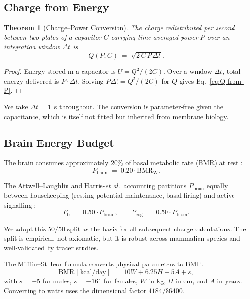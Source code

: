 \documentclass[11pt,twocolumn,a4paper]{article}
\newtheorem{theorem}{Theorem}[section]
\theoremstyle{definition}
\theoremstyle{remark}
\newcommand{\Pb}{P_{\mathrm{b}}}
\newcommand{\Pbrain}{P_{\mathrm{brain}}}
\newcommand{\Pcog}{P_{\mathrm{cog}}}
\begin{document}
\subsection{Charge from Energy}

\begin{theorem}[Charge--Power Conversion]
\label{thm:charge-power}
The charge redistributed per second between two plates of a capacitor
$C$ carrying time-averaged power $P$ over an integration window
$\Delta t$ is
\begin{equation}
Q(P; C) \;=\; \sqrt{2\,C\,P\,\Delta t}.
\label{eq:Q-from-P}
\end{equation}
\end{theorem}

\begin{proof}
Energy stored in a capacitor is $U = Q^2/(2C)$. Over a window $\Delta
t$, total energy delivered is $P \cdot \Delta t$. Solving
$P\Delta t = Q^2/(2C)$ for $Q$ gives Eq.~\eqref{eq:Q-from-P}.
\end{proof}

We take $\Delta t = 1$~s throughout. The conversion is
parameter-free given the capacitance, which is itself
not fitted but inherited from membrane biology.

\subsection{Brain Energy Budget}

The brain consumes approximately $20\%$ of basal metabolic rate
(BMR) at rest \citep{raichle2006, attwell2001}:
\begin{equation}
\Pbrain \;=\; 0.20 \cdot \mathrm{BMR}_{\mathrm{W}}.
\end{equation}

The Attwell--Laughlin and Harris-\emph{et al.}\ accounting partitions
$\Pbrain$ equally between housekeeping (resting potential maintenance,
basal firing) and active signalling \citep{attwell2001, harris2012}:
\begin{equation}
\Pb \;=\; 0.50 \cdot \Pbrain, \qquad \Pcog \;=\; 0.50 \cdot \Pbrain.
\label{eq:fifty-fifty}
\end{equation}

We adopt this $50/50$ split as the basis for all subsequent charge
calculations. The split is empirical, not axiomatic, but it is
robust across mammalian species and well-validated by tracer studies.

The Mifflin--St Jeor formula \citep{mifflin1990} converts physical
parameters to BMR:
\begin{equation}
\mathrm{BMR}\,[\mathrm{kcal/day}] \;=\; 10 W + 6.25 H - 5 A + s,
\end{equation}
with $s = +5$ for males, $s = -161$ for females, $W$ in kg, $H$ in
cm, and $A$ in years. Converting to watts uses the dimensional
factor $4184/86400$.
\end{document}
